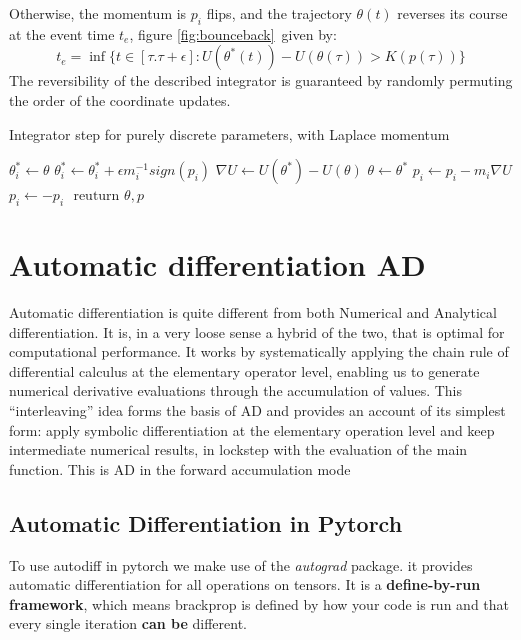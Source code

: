 \documentclass[]{report}
\begin{document}
Otherwise, the momentum is $p_{i}$ flips, and the trajectory $\theta(t)$ reverses its course at the event time $t_{e}$, figure \ref{fig:bounceback}\,  given by:\begin{equation}
	t_{e} = \inf\{t \in [\tau. \tau + \epsilon] : U(\theta^{*}(t)) - U(\theta(\tau)) > K(p(\tau))\}
\end{equation}
The reversibility of the described integrator is guaranteed by randomly permuting the order of the coordinate updates. 
\begin{algorithm}
	\label{alg:intcord}
	\caption{Integrator step for purely discrete parameters, with Laplace momentum}
		\begin{algorithmic}[1]
			\State $ \theta_{i}^{*} \gets \theta$
			\State $ \theta_{i}^{*} \gets \theta^{*}_{i} + \epsilon m^{-1}_{i} sign(p_{i})$
			\State $ \nabla U \gets U(\theta^{*}) - U(\theta)$
			\State $ \theta \gets \theta^{*} $
			\State $ p_{i} \gets p_{i} - m_{i} \nabla U$
			\Else
			\State $p_{i} \gets - p_{i}$
			\Endif 
			\State $\text{ reuturn } \theta, p$
		\end{algorithmic} 
\end{algorithm}


\section{Automatic differentiation AD}
Automatic differentiation is quite different from both Numerical and Analytical differentiation. It is, in a very loose sense a hybrid of the two, that is optimal for computational performance. It works by systematically applying the chain rule of differential calculus at the elementary operator level, enabling us to generate numerical derivative evaluations through the accumulation of values.   
This “interleaving” idea forms the basis of AD and provides an account of
its simplest form: apply symbolic differentiation at the elementary operation
level and keep intermediate numerical results, in lockstep with the evaluation
of the main function. This is AD in the forward accumulation mode

\subsection{Automatic Differentiation in Pytorch}
To use autodiff in pytorch we make use of the \textit{autograd} package. it provides automatic differentiation for all operations on tensors. It is a \textbf{define-by-run framework}, which means brackprop is defined by how your code is run and that every single iteration \textbf{can be} different. 
\end{document}
